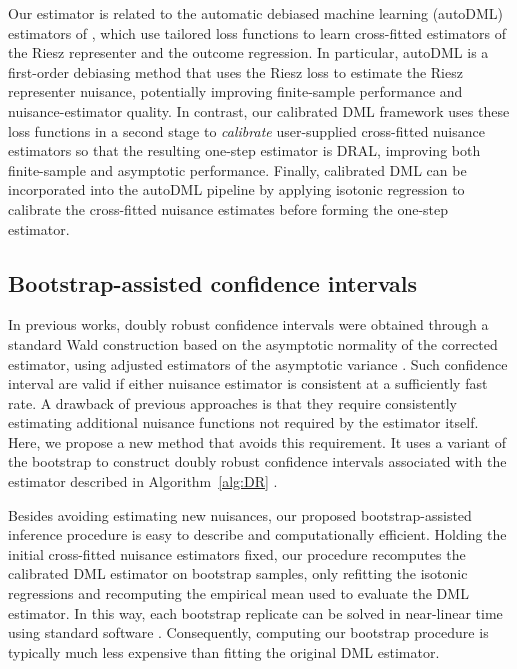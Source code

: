 \documentclass[11pt]{article}
\theoremstyle{plain}
\begin{document}
 
{\color{purple}
Our estimator is related to the automatic debiased machine learning (autoDML) estimators of
\cite{chernozhukov2018double,chernozhukov2022riesznet,chernozhukov2022automatic}, which use tailored loss functions to learn cross-fitted estimators of the Riesz representer and the outcome regression. In particular, autoDML is a first-order debiasing method that uses the Riesz loss to estimate the Riesz representer nuisance, potentially improving finite-sample performance and nuisance-estimator quality. In contrast, our calibrated DML framework uses these loss functions in a second stage to \emph{calibrate} user-supplied cross-fitted nuisance estimators so that the resulting one-step estimator is DRAL, improving both finite-sample and asymptotic performance. Finally, calibrated DML can be incorporated into the autoDML pipeline by applying isotonic regression to calibrate the cross-fitted nuisance estimates before forming the one-step estimator.
}

 \subsection{Bootstrap-assisted confidence intervals}

In previous works, doubly robust confidence intervals were obtained through a standard Wald construction based on the asymptotic normality of the corrected estimator, using adjusted estimators of the asymptotic variance \citep{benkeser2017doubly, dukes2024doubly, bonvini2024doubly}. Such confidence interval are valid if either nuisance estimator is consistent at a sufficiently fast rate. A drawback of previous approaches is that they require consistently estimating additional nuisance functions not required by the estimator itself. Here, we propose a new method that avoids this requirement. It uses a variant of the bootstrap to construct doubly robust confidence intervals associated with the estimator described in Algorithm~\ref{alg:DR} \citep{efron1994introduction}.


Besides avoiding estimating new nuisances, our proposed bootstrap-assisted inference procedure is easy to describe and computationally efficient. Holding the initial cross-fitted nuisance estimators fixed, our procedure recomputes the calibrated DML estimator on bootstrap samples, only refitting the isotonic regressions and recomputing the empirical mean used to evaluate the DML estimator. In this way, each bootstrap replicate can be solved in near-linear time using standard software \citep{barlow1972isotonic}. Consequently, computing our bootstrap procedure is typically much less expensive than fitting the original DML estimator.
\end{document}
